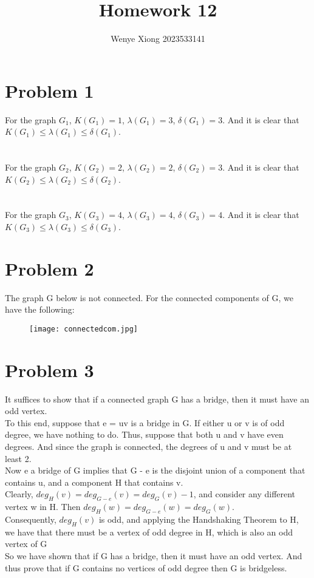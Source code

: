 \documentclass{article}
\author{Wenye Xiong 2023533141}
\title{Homework 12}
\begin{document}
\maketitle

\section{Problem 1}
For the graph $G_1$, $K(G_1) = 1$, $\lambda(G_1) = 3$, $\delta(G_1) = 3$. And it is clear that $K(G_1) \leq \lambda(G_1) \leq \delta(G_1)$.\\
\\ \hspace*{\fill} \\
For the graph $G_2$, $K(G_2) = 2$, $\lambda(G_2) = 2$, $\delta(G_2) = 3$. And it is clear that $K(G_2) \leq \lambda(G_2) \leq \delta(G_2)$.\\
\\ \hspace*{\fill} \\
For the graph $G_3$, $K(G_3) = 4$, $\lambda(G_3) = 4$, $\delta(G_3) = 4$. And it is clear that $K(G_3) \leq \lambda(G_3) \leq \delta(G_3)$.\\
\section{Problem 2}
The graph G below is not connected. For the connected components of G, we have the following:\\
\begin{figure}[H]
\centering
\texttt{[image: connectedcom.jpg]}
\end{figure}
\newpage
\section{Problem 3}
It suffices to show that if a connected graph G has a bridge, then it must have an odd vertex.\\
To this end, suppose that e = uv is a bridge in G. If either u or v is of odd degree, we have nothing to do. Thus, suppose that both u and v have even degrees. And since the graph is connected, the degrees of u and v
must be at least 2.\\
Now e a bridge of G implies that G - e is the disjoint union
of a component that contains u, and a component H that contains v.\\
Clearly, $deg_H(v) = deg_{G-e}(v) = deg_G(v) - 1$, and consider any different vertex w in H. Then $deg_H(w) = deg_{G-e}(w) = deg_G(w)$.\\
Consequently, $deg_H(v)$ is odd, and applying the Handshaking Theorem to H, we have that there must be a vertex of odd degree in H, which is also an odd vertex of G\\
So we have shown that if G has a bridge, then it must have an odd vertex. And thus prove that if G contains no vertices of odd degree then G is bridgeless.\\
\end{document}
